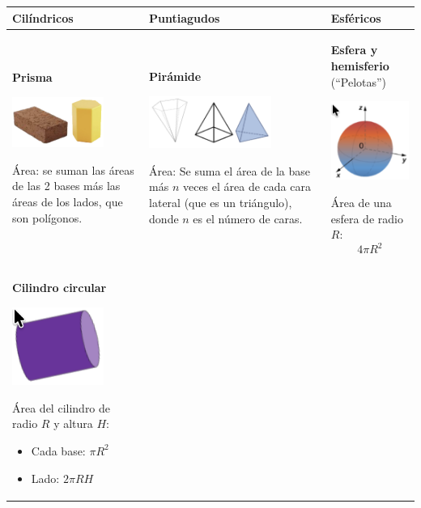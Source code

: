 \documentclass[12pt,a4paper]{article}
\begin{document}
\begin{center}
\begin{tabular}{|
	>{\centering\arraybackslash}m{4cm}|
	>{\centering\arraybackslash}m{4cm}|
	>{\centering\arraybackslash}m{4cm}|}
\hline
\textbf{Cilíndricos} & \textbf{Puntiagudos} & \textbf{Esféricos} \\
\hline
\textbf{Prisma}

\includegraphics[width=3cm]{Figuras/fig60.png}

Área: se suman las áreas de las 2 bases más las áreas de los lados, que son polígonos. &
\textbf{Pirámide}

\includegraphics[width=4cm]{Figuras/fig62.png}

Área: Se suma el área de la base más $n$ veces el área de cada cara lateral (que es un triángulo), donde $n$ es el número de caras. &
\textbf{Esfera y hemisferio} (``Pelotas'')

\includegraphics[width=3cm]{Figuras/fig64.png}

Área de una esfera de radio $R$:
$$4\pi R^2$$ \\
\hline
\textbf{Cilindro circular}

\includegraphics[width=3cm]{Figuras/fig61.png}

Área del cilindro de radio $R$ y altura $H$:
\begin{itemize}[nosep]
    \item Cada base: $\pi R^2$
    \item Lado: $2\pi RH$
\end{itemize}


\end{tabular}
\end{center}
\end{document}

